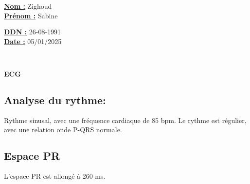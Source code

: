 \documentclass[12pt,a4paper]{article}%
\begin{document}
%
\normalsize%
\begin{minipage}{0.5\linewidth}%
\textbf{\underline{Nom :}} \hspace{1cm} Zighoud%
\\%
\textbf{\underline{Prénom :}} \hspace{1cm} Sabine%
\\%
\end{minipage}%
\begin{minipage}{0.5\linewidth}%
\textbf{\underline{DDN :}} \hspace{1cm} 26-08-1991%
\\%
\textbf{\underline{Date :}} \hspace{1cm} 05/01/2025%
\\%
\end{minipage}%
\hspace{\textwidth}%
\\%
\begin{center}%

        \begin{tcolorbox}[
            colframe=main_title_border_color,        %
            colback=main_title_background_color,        %
            coltitle=main_title_border_color,       %
            arc=8pt,              %
            boxrule=0.5mm,          %
            auto outer arc,       %
            width=\linewidth,     %
            halign=center         %
        ]
        \LARGE{\textbf{ECG}}
        \end{tcolorbox}
\end{center}%
%
\vspace*{\baselineskip}%
%
\vspace*{\baselineskip}%
\subsection*{Analyse du rythme:}%
\label{subsec:Analysedurythme}%

%
Rythme sinusal, avec une fréquence cardiaque de 85 bpm.  Le rythme est régulier, avec une relation onde P{-}QRS normale.%
\subsection*{Espace PR}%
\label{subsec:EspacePR}%

%
L’espace PR est allongé à 260 ms.%
\end{document}

